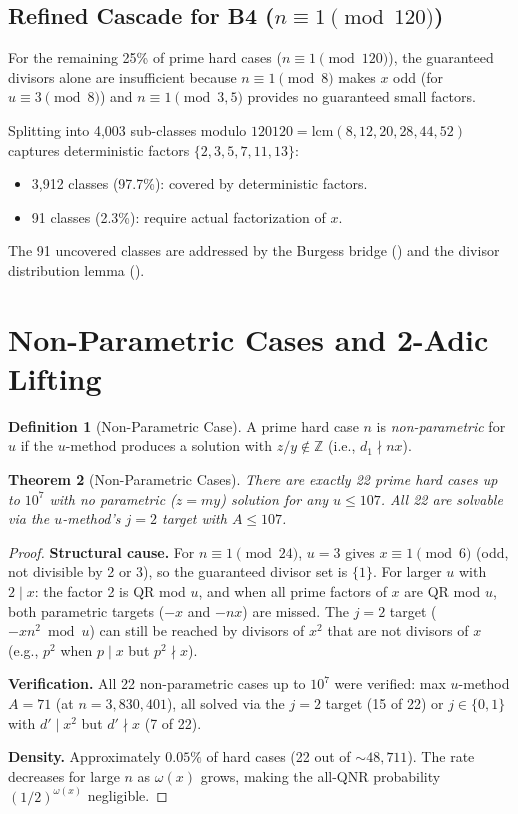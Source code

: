 \documentclass[11pt,a4paper]{article}
\theoremstyle{plain}
\newtheorem{theorem}{Theorem}[section]
\theoremstyle{plain}
\theoremstyle{definition}
\newtheorem{definition}[theorem]{Definition}
\numberwithin{equation}{section}
\begin{document}
\subsection{Refined Cascade for B4 ($n \equiv 1 \pmod{120}$)}

For the remaining 25\% of prime hard cases ($n \equiv 1 \pmod{120}$), the guaranteed divisors alone are insufficient because $n \equiv 1 \pmod{8}$ makes $x$ odd (for $u \equiv 3 \pmod{8}$) and $n \equiv 1 \pmod{3, 5}$ provides no guaranteed small factors.

Splitting into 4,003 sub-classes modulo $120120 = \mathrm{lcm}(8, 12, 20, 28, 44, 52)$ captures deterministic factors $\{2, 3, 5, 7, 11, 13\}$:
\begin{itemize}[noitemsep]
  \item 3,912 classes (97.7\%): covered by deterministic factors.
  \item 91 classes (2.3\%): require actual factorization of $x$.
\end{itemize}

The 91 uncovered classes are addressed by the Burgess bridge () and the divisor distribution lemma ().

\section{Non-Parametric Cases and 2-Adic Lifting}

\begin{definition}[Non-Parametric Case]
A prime hard case $n$ is \emph{non-parametric} for $u$ if the $u$-method produces a solution with $z/y \notin \mathbb{Z}$ (i.e., $d_1 \nmid nx$).
\end{definition}

\begin{theorem}[Non-Parametric Cases]\label{thm:nonparam}
There are exactly 22 prime hard cases up to $10^7$ with no parametric ($z = my$) solution for any $u \leq 107$. All 22 are solvable via the $u$-method's $j = 2$ target with $A \leq 107$.
\end{theorem}

\begin{proof}
\textbf{Structural cause.} For $n \equiv 1 \pmod{24}$, $u = 3$ gives $x \equiv 1 \pmod{6}$ (odd, not divisible by 2 or 3), so the guaranteed divisor set is $\{1\}$. For larger $u$ with $2 \mid x$: the factor 2 is QR mod $u$, and when all prime factors of $x$ are QR mod $u$, both parametric targets ($-x$ and $-nx$) are missed. The $j = 2$ target ($-xn^2 \bmod u$) can still be reached by divisors of $x^2$ that are not divisors of $x$ (e.g., $p^2$ when $p \mid x$ but $p^2 \nmid x$).

\textbf{Verification.} All 22 non-parametric cases up to $10^7$ were verified: max $u$-method $A = 71$ (at $n = 3{,}830{,}401$), all solved via the $j = 2$ target (15 of 22) or $j \in \{0, 1\}$ with $d' \mid x^2$ but $d' \nmid x$ (7 of 22).

\textbf{Density.} Approximately $0.05\%$ of hard cases (22 out of $\sim 48{,}711$). The rate decreases for large $n$ as $\omega(x)$ grows, making the all-QNR probability $(1/2)^{\omega(x)}$ negligible.
\end{proof}
\end{document}
